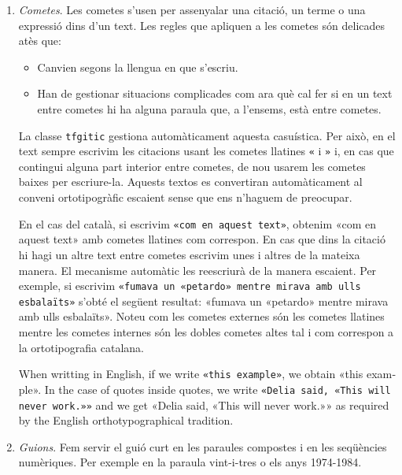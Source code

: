 \documentclass{tfgitic}
\begin{document}
\begin{enumerate}

\item \emph{Cometes}. \label{pun:cometes} Les cometes s'usen per
  assenyalar una citació, un terme o una expressió dins d’un text. Les
  regles que apliquen a les cometes són delicades atès que:
  \begin{itemize}
  \item Canvien segons la llengua en que s'escriu.
  \item Han de gestionar situacions complicades com ara què cal fer si
    en un text entre cometes hi ha alguna paraula que, a l'ensems,
    està entre cometes.
  \end{itemize}
  La classe \texttt{tfgitic} gestiona automàticament aquesta
  casuística. Per això, en el text sempre escrivim les citacions usant
  les cometes llatines \verb!«! i \verb!»! i, en cas que contingui
  alguna part interior entre cometes, de nou usarem les cometes baixes
  per escriure-la.  Aquests textos es convertiran automàticament al
  conveni ortotipogràfic escaient sense que ens n'haguem de preocupar.

  En el cas del català, si escrivim \verb!«com en aquest text»!,
  obtenim «com en aquest text» amb cometes llatines com correspon. En
  cas que dins la citació hi hagi un altre text entre cometes escrivim
  unes i altres de la mateixa manera. El mecanisme automàtic les
  reescriurà de la manera escaient. Per exemple, si escrivim
  \verb!«fumava un «petardo» mentre mirava amb ulls esbalaïts»!
  s'obté el següent resultat: «fumava un «petardo» mentre mirava amb
  ulls esbalaïts». Noteu com les cometes externes són les cometes
  llatines mentre les cometes internes són les dobles cometes altes tal
  i com correspon a la ortotipografia catalana.

  \begin{otherlanguage}{english}
    When writting in English, if we write \verb!«this example»!, we
    obtain «this example». In the case of quotes inside quotes, we
    write \verb!«Delia said, «This will never work.»»!  and we get
    «Delia said, «This will never work.»» as required by the English
    orthotypographical tradition.
  \end{otherlanguage}

\item \emph{Guions}. Fem servir el guió curt en les paraules compostes
  i en les seqüències numèriques. Per exemple en la paraula
  vint-i-tres o els anys 1974-1984.


\end{enumerate}
\end{document}
